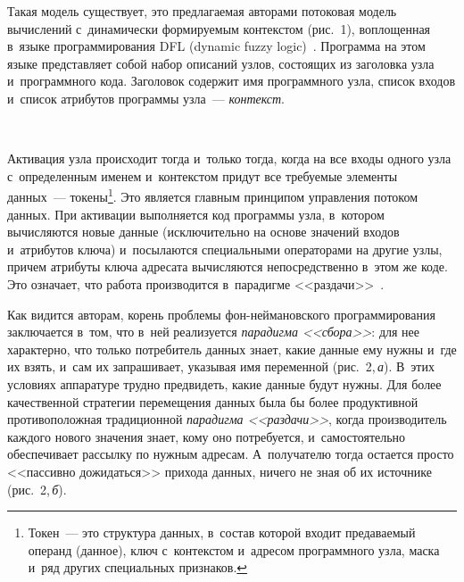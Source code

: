 \begin{multicols}{2}
\vspace*{-16pt}


  Такая модель существует, это предлагаемая авторами потоковая модель 
вычислений с~динамически формируемым контекстом (рис.~1), воплощенная 
в~языке программирования DFL (dynamic fuzzy
logic)~\cite{1-zm, 2-zm}. Программа на этом языке 
представляет собой набор описаний узлов, состоящих из заголовка узла 
и~программного кода. Заголовок содержит имя программного узла, список 
входов и~список атрибутов программы узла~--- \textit{контекст}. 

\begin{figure*} %
  \vspace*{1pt}
 \begin{center}
 \mbox{%
 \epsfxsize=137.625mm
 }
 \end{center}
 \vspace*{-11pt}
  \end{figure*}
  
Активация 
узла происходит тогда и~только тогда, когда на все входы одного узла 
с~определенным именем и~контекстом придут все требуемые элементы 
данных~--- токены\footnote{Токен~--- это структура данных, в~состав которой входит предаваемый 
операнд (данное), ключ с~контекстом и~адресом программного узла, маска и~ряд других специальных 
признаков.}. Это является главным принципом управ\-ле\-ния потоком данных. 
При 
активации выполняется код программы узла, в~котором вычисляются новые 
данные (исключительно на основе значений входов и~атрибутов ключа) 
и~посылаются специальными операторами на другие узлы, причем атрибуты 
ключа адресата вычисляются непосредственно в~этом же коде. Это означает, 
что работа производится в~парадигме <<раздачи>>~\cite{3-zm}. 


  
  Как видится авторам, корень проблемы фон-ней\-ма\-нов\-ско\-го 
программирования заключается в~том, что в~ней реализуется \textit{парадигма 
<<сбора>>}: для нее характерно, что только потребитель данных знает, какие 
данные ему нужны и~где их взять, и~сам их запрашивает, указывая имя 
переменной (рис.~2,\,\textit{а}). В~этих условиях аппаратуре трудно 
предвидеть, какие данные будут нужны. Для более качественной стратегии 
перемещения данных была бы более продуктивной противоположная 
традиционной \textit{парадигма <<раздачи>>}, когда производитель каждого 
нового значения знает, кому оно потребуется, и~самостоятельно обеспечивает 
рассылку по нужным адресам. А~получателю тогда остается прос\-то 
<<пассивно дожидаться>> прихода данных, ничего не зная об их источнике 
(рис.~2,\,\textit{б}).
  

\end{multicols}
